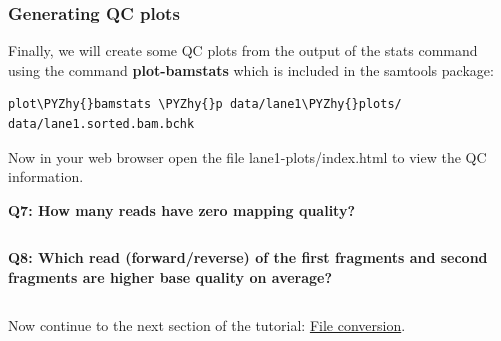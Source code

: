 \documentclass[11pt]{article}
\makeatletter
\def\PYZhy{\char`\-}
\newcommand{\boxspacing}{\kern\kvtcb@left@rule\kern\kvtcb@boxsep}
\newcommand{\prompt}[4]{
        {\ttfamily\llap{{\color{blue}\LARGE\faKeyboardO\hspace{3pt}#4}}\vspace{-\baselineskip}}
    }
\makeatother
\begin{document}
    \hypertarget{generating-qc-plots}{%
\subsubsection{Generating QC plots}\label{generating-qc-plots}}

Finally, we will create some QC plots from the output of the stats
command using the command \textbf{plot-bamstats} which is included in
the samtools package:

    \begin{tcolorbox}[breakable, size=fbox, boxrule=1pt, pad at break*=1mm,colback=cellbackground, colframe=cellborder]
\prompt{In}{incolor}{ }{\boxspacing}
\begin{Verbatim}[commandchars=\\\{\}]
plot\PYZhy{}bamstats \PYZhy{}p data/lane1\PYZhy{}plots/ data/lane1.sorted.bam.bchk
\end{Verbatim}
\end{tcolorbox}

    Now in your web browser open the file lane1-plots/index.html to view the
QC information.

\textbf{Q7: How many reads have zero mapping quality?}

    \begin{tcolorbox}[breakable, size=fbox, boxrule=1pt, pad at break*=1mm,colback=cellbackground, colframe=cellborder]
\prompt{In}{incolor}{ }{\boxspacing}
\begin{Verbatim}[commandchars=\\\{\}]

\end{Verbatim}
\end{tcolorbox}

    \textbf{Q8: Which read (forward/reverse) of the first fragments and
second fragments are higher base quality on average?}

    \begin{tcolorbox}[breakable, size=fbox, boxrule=1pt, pad at break*=1mm,colback=cellbackground, colframe=cellborder]
\prompt{In}{incolor}{ }{\boxspacing}
\begin{Verbatim}[commandchars=\\\{\}]

\end{Verbatim}
\end{tcolorbox}

    Now continue to the next section of the tutorial:
\href{conversion.ipynb}{File conversion}.
\end{document}
